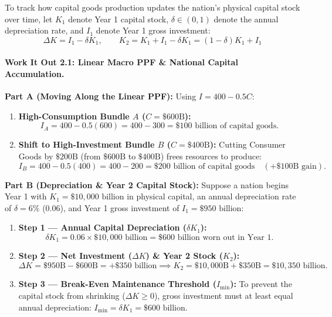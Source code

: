 \documentclass[11pt,letterpaper]{article}
\begin{document}
To track how capital goods production updates the nation's physical capital stock over time, let $K_1$ denote Year 1 capital stock, $\delta \in (0, 1)$ denote the annual depreciation rate, and $I_1$ denote Year 1 gross investment:
\begin{equation}
\Delta K = I_1 - \delta K_1, \qquad K_2 = K_1 + I_1 - \delta K_1 = (1 - \delta)K_1 + I_1
\end{equation}

\paragraph{Work It Out 2.1: Linear Macro PPF \& National Capital Accumulation.}
\textbf{Part A (Moving Along the Linear PPF):} Using $I = 400 - 0.5C$:
\begin{enumerate}
  \item \textbf{High-Consumption Bundle $A$ ($C = \$600\text{B}$):}
  $$I_A = 400 - 0.5(600) = 400 - 300 = \$100\text{ billion of capital goods}.$$
  \item \textbf{Shift to High-Investment Bundle $B$ ($C = \$400\text{B}$):}
  Cutting Consumer Goods by $\$200\text{B}$ (from $\$600\text{B}$ to $\$400\text{B}$) frees resources to produce:
  $$I_B = 400 - 0.5(400) = 400 - 200 = \$200\text{ billion of capital goods} \quad (+\$100\text{B gain}).$$
\end{enumerate}

\noindent\textbf{Part B (Depreciation \& Year 2 Capital Stock):} Suppose a nation begins Year 1 with $K_1 = \$10,000\text{ billion}$ in physical capital, an annual depreciation rate of $\delta = 6\%$ ($0.06$), and Year 1 gross investment of $I_1 = \$950\text{ billion}$:
\begin{enumerate}
  \item \textbf{Step 1 — Annual Capital Depreciation ($\delta K_1$):}
  $$\delta K_1 = 0.06 \times \$10,000\text{ billion} = \$600\text{ billion worn out in Year 1}.$$
  \item \textbf{Step 2 — Net Investment ($\Delta K$) \& Year 2 Stock ($K_2$):}
  $$\Delta K = \$950\text{B} - \$600\text{B} = +\$350\text{ billion} \implies K_2 = \$10,000\text{B} + \$350\text{B} = \$10,350\text{ billion}.$$
  \item \textbf{Step 3 — Break-Even Maintenance Threshold ($I_{\min}$):}
  To prevent the capital stock from shrinking ($\Delta K \ge 0$), gross investment must at least equal annual depreciation: $I_{\min} = \delta K_1 = \$600\text{ billion}$.
\end{enumerate}
\end{document}
